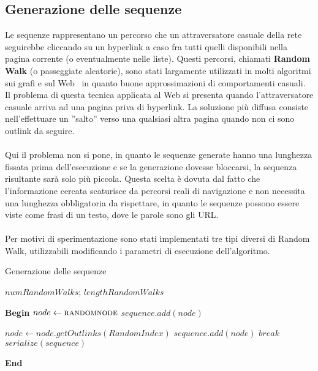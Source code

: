 \subsection{Generazione delle sequenze}
Le sequenze rappresentano un percorso che un attraversatore casuale della rete seguirebbe cliccando su un hyperlink a caso fra tutti quelli disponibili nella pagina corrente (o eventualmente nelle liste). Questi percorsi, chiamati \textbf{Random Walk} (o passeggiate aleatorie), sono stati largamente utilizzati in molti algoritmi sui grafi e sul Web~\cite{aldous14} in quanto buone approssimazioni di comportamenti casuali. Il problema di questa tecnica applicata al Web si presenta quando l'attraversatore casuale arriva ad una pagina priva di hyperlink. La soluzione più diffusa consiste nell'effettuare un ''salto'' verso una qualsiasi altra pagina quando non ci sono outlink da seguire. 
\\\\
Qui il problema non si pone, in quanto le sequenze generate hanno una lunghezza fissata prima dell'esecuzione e se la generazione dovesse bloccarsi, la sequenza risultante sarà solo più piccola. Questa scelta è dovuta dal fatto che l'informazione cercata scaturisce da percorsi reali di navigazione e non necessita una lunghezza obbligatoria da rispettare, in quanto le sequenze possono essere viste come frasi di un testo, dove le parole sono gli URL.
\\\\
Per motivi di sperimentazione sono stati implementati tre tipi diversi di Random Walk, utilizzabili modificando i parametri di esecuzione dell'algoritmo.



\begin{algorithm}[H]
\caption{Generazione delle sequenze}
\begin{algorithmic}

	\State $numRandomWalks$;	
	\State $lengthRandomWalks$ 
 	
 	\vspace*{+0.5cm}
 	
	\State \textbf{Begin}
	\State $node \gets \Call{randomnode}{}$
		\State $sequence.add(node)$
		
				\State $node \gets node.getOutlinks(RandomIndex)$
				\State $sequence.add(node)$
			\Else
				\State $break$
			\EndIf
		\EndWhile
		\State $serialize(sequence)$
		
	\EndFor
	\State \textbf{End}
\end{algorithmic}
\end{algorithm}



